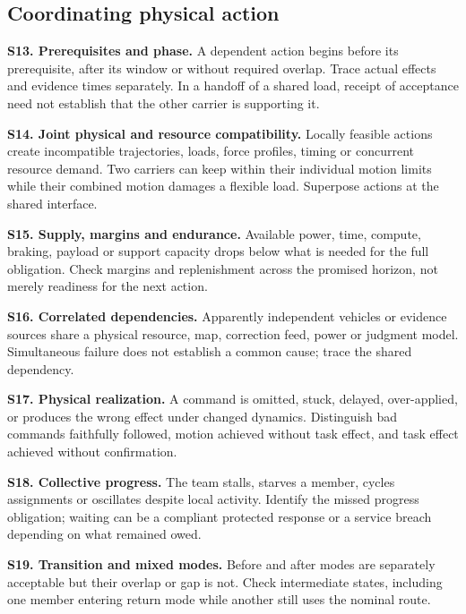 \documentclass[11pt]{article}
\newcommand{\entry}[3]{\par\smallskip\noindent\textbf{#1. #2.} #3\par}
\begin{document}
\subsection{Coordinating physical action}
\entry{S13}{Prerequisites and phase}{A dependent action begins before its prerequisite, after its window or without required overlap. Trace actual effects and evidence times separately. In a handoff of a shared load, receipt of acceptance need not establish that the other carrier is supporting it.}
\entry{S14}{Joint physical and resource compatibility}{Locally feasible actions create incompatible trajectories, loads, force profiles, timing or concurrent resource demand. Two carriers can keep within their individual motion limits while their combined motion damages a flexible load. Superpose actions at the shared interface.}
\entry{S15}{Supply, margins and endurance}{Available power, time, compute, braking, payload or support capacity drops below what is needed for the full obligation. Check margins and replenishment across the promised horizon, not merely readiness for the next action.}
\entry{S16}{Correlated dependencies}{Apparently independent vehicles or evidence sources share a physical resource, map, correction feed, power or judgment model. Simultaneous failure does not establish a common cause; trace the shared dependency.}
\entry{S17}{Physical realization}{A command is omitted, stuck, delayed, over-applied, or produces the wrong effect under changed dynamics. Distinguish bad commands faithfully followed, motion achieved without task effect, and task effect achieved without confirmation.}
\entry{S18}{Collective progress}{The team stalls, starves a member, cycles assignments or oscillates despite local activity. Identify the missed progress obligation; waiting can be a compliant protected response or a service breach depending on what remained owed.}
\entry{S19}{Transition and mixed modes}{Before and after modes are separately acceptable but their overlap or gap is not. Check intermediate states, including one member entering return mode while another still uses the nominal route.}
\end{document}
